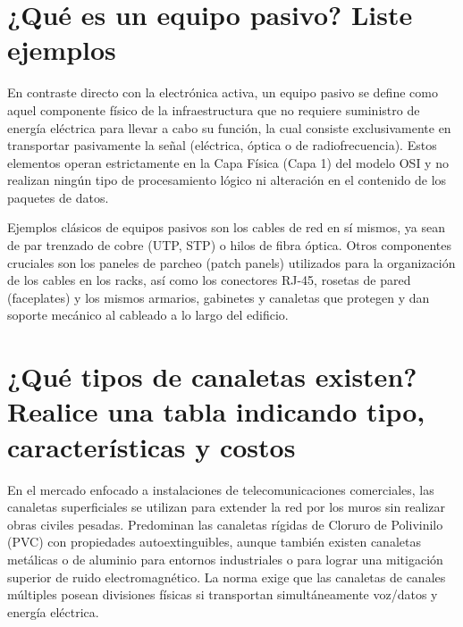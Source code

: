 \documentclass[a4paper,12pt]{article}
\begin{document}
\section{¿Qué es un equipo pasivo? Liste ejemplos}

En contraste directo con la electrónica activa, un equipo pasivo se define como aquel componente físico de la infraestructura que no requiere suministro de energía eléctrica para llevar a cabo su función, la cual consiste exclusivamente en transportar pasivamente la señal (eléctrica, óptica o de radiofrecuencia). Estos elementos operan estrictamente en la Capa Física (Capa 1) del modelo OSI y no realizan ningún tipo de procesamiento lógico ni alteración en el contenido de los paquetes de datos.

Ejemplos clásicos de equipos pasivos son los cables de red en sí mismos, ya sean de par trenzado de cobre (UTP, STP) o hilos de fibra óptica. Otros componentes cruciales son los paneles de parcheo (patch panels) utilizados para la organización de los cables en los racks, así como los conectores RJ-45, rosetas de pared (faceplates) y los mismos armarios, gabinetes y canaletas que protegen y dan soporte mecánico al cableado a lo largo del edificio.

\newpage

\section{¿Qué tipos de canaletas existen? Realice una tabla indicando tipo, características y costos}

En el mercado enfocado a instalaciones de telecomunicaciones comerciales, las canaletas superficiales se utilizan para extender la red por los muros sin realizar obras civiles pesadas. Predominan las canaletas rígidas de Cloruro de Polivinilo (PVC) con propiedades autoextinguibles, aunque también existen canaletas metálicas o de aluminio para entornos industriales o para lograr una mitigación superior de ruido electromagnético. La norma exige que las canaletas de canales múltiples posean divisiones físicas si transportan simultáneamente voz/datos y energía eléctrica.
\end{document}
